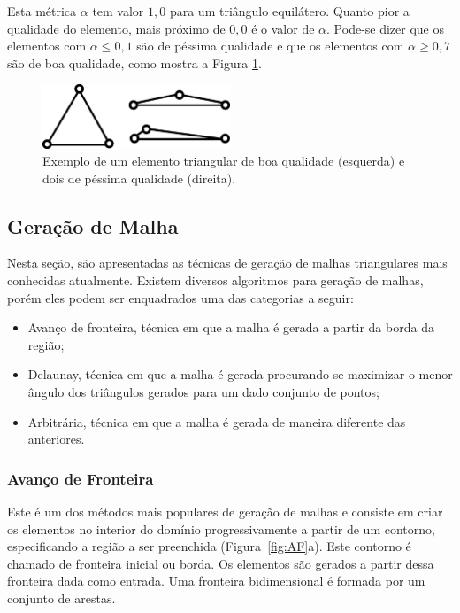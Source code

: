 Esta métrica $\alpha$ tem valor $1,0$ para um triângulo equilátero. Quanto pior a qualidade do elemento, mais próximo de $0,0$ é o valor de $\alpha$. Pode-se dizer que os elementos com $\alpha \leq 0,1$ são de péssima qualidade e que os elementos com $\alpha \geq 0,7$ são de boa qualidade, como mostra a Figura \ref{fig:qualidade_elemento}.

 \begin{figure}[htbp]
     \centering
     \includegraphics[width=0.5\textwidth]{fig/qualidade_elemento.png}
     \caption{Exemplo de um elemento triangular de boa qualidade (esquerda) e dois de péssima qualidade (direita).} 
     \label{fig:qualidade_elemento}
 \end{figure}

\subsection{Geração de Malha}\label{Geração de Malha}

Nesta seção, são apresentadas as técnicas de geração de malhas triangulares mais conhecidas atualmente. Existem diversos algoritmos para geração de malhas, porém eles podem ser enquadrados uma das categorias a seguir:

\begin{itemize}
  \item Avanço de fronteira, técnica em que a malha é gerada a partir da borda da região;

  \item Delaunay, técnica em que a malha é gerada procurando-se maximizar o menor ângulo dos triângulos gerados para um dado conjunto de pontos;

  \item Arbitrária, técnica em que a malha é gerada de maneira diferente das anteriores.
\end{itemize}

\subsubsection{Avanço de Fronteira}

Este é um dos métodos mais populares de geração de malhas e consiste em criar os elementos no interior do domínio progressivamente a partir de um contorno, especificando a região a ser preenchida (Figura~\ref{fig:AF}a). Este contorno é chamado de fronteira inicial ou borda. Os elementos são gerados a partir dessa fronteira dada como entrada. Uma fronteira bidimensional é formada por um conjunto de arestas.

